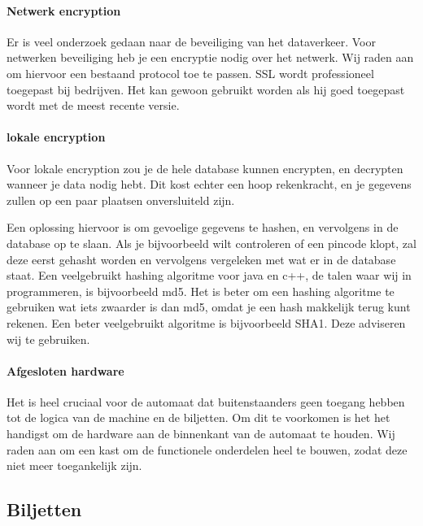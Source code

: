 \documentclass{article}
\begin{document}
\paragraph{Netwerk encryption}

Er is veel onderzoek gedaan naar de beveiliging van het dataverkeer.
Voor netwerken beveiliging heb je een encryptie nodig over het netwerk.
Wij raden aan om hiervoor een bestaand protocol toe te passen.
SSL wordt professioneel toegepast bij bedrijven.
Het kan gewoon gebruikt worden als hij goed toegepast wordt met de meest recente versie.

\paragraph{lokale encryption}

Voor lokale encryption zou je de hele database kunnen encrypten, en decrypten wanneer je data nodig hebt.
Dit kost echter een hoop rekenkracht, en je gegevens zullen op een paar plaatsen onversluiteld zijn.

Een oplossing hiervoor is om gevoelige gegevens te hashen, en vervolgens in de database op te slaan.
Als je bijvoorbeeld wilt controleren of een pincode klopt, zal deze eerst gehasht worden en vervolgens vergeleken met wat er in de database staat.
Een veelgebruikt hashing algoritme voor java en c++, de talen waar wij in programmeren, is bijvoorbeeld md5.
Het is beter om een hashing algoritme te gebruiken wat iets zwaarder is dan md5, omdat je een hash makkelijk terug kunt rekenen.
Een beter veelgebruikt algoritme is bijvoorbeeld SHA1.
Deze adviseren wij te gebruiken.

\hfill

\centerline{  }

\paragraph{Afgesloten hardware}

Het is heel cruciaal voor de automaat dat buitenstaanders geen toegang hebben tot de logica van de machine en de biljetten.
Om dit te voorkomen is het het handigst om de hardware aan de binnenkant van de automaat te houden.
Wij raden aan om een kast om de functionele onderdelen heel te bouwen, zodat deze niet meer toegankelijk zijn.

\subsection{Biljetten}
\end{document}
